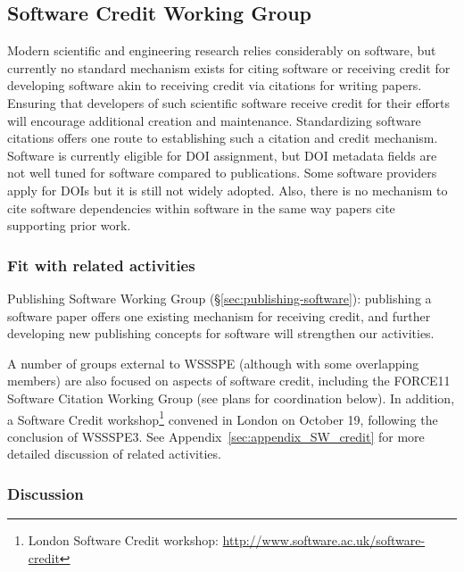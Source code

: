 \subsection{Software Credit Working Group}
\label{sec:software-credit}


Modern scientific and engineering research relies considerably on software, 
but currently no standard mechanism exists for citing software or receiving 
credit for developing software akin to receiving credit via citations for 
writing papers. Ensuring that developers of such scientific software receive 
credit for their efforts will encourage additional creation and maintenance. 
Standardizing software citations offers one route to establishing such a
citation and credit mechanism. Software is currently eligible for DOI
assignment, but DOI metadata fields are not well tuned for software compared to
publications. Some software providers apply for DOIs but it is still not widely
adopted. Also, there is no mechanism to cite software dependencies within
software in the same way papers cite supporting prior work.

\subsubsection{Fit with related activities}

Publishing Software Working Group (\S\ref{sec:publishing-software}): publishing
a software paper offers one existing mechanism for receiving credit, and further
developing new publishing concepts for software will strengthen our activities.

A number of groups external to WSSSPE (although with some overlapping members)
are also focused on aspects of software credit, including the FORCE11 Software
Citation Working Group (see plans for coordination below). In addition, a
Software Credit workshop\footnote{London Software Credit workshop:
\url{http://www.software.ac.uk/software-credit}} convened in London on October
19, following the conclusion of WSSSPE3. See
Appendix~\ref{sec:appendix_SW_credit} for more detailed discussion of related
activities.

\subsubsection{Discussion}

